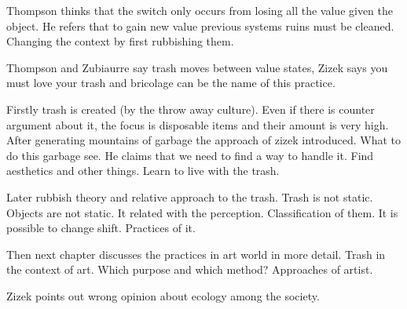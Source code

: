Thompson thinks that the switch only occurs from losing all the value given the object. He refers that to gain new value previous systems ruins must be cleaned. Changing the context by first rubbishing them.

Thompson and Zubiaurre say trash moves between value states, Zizek says you must love your trash and bricolage can be the name of this practice.

Firstly trash is created (by the throw away culture). Even if there is counter argument about it, the focus is disposable items and their amount is very high. After generating mountains of garbage the approach of zizek introduced. What to do this garbage see. He claims that we need to find a way to handle it. Find aesthetics and other things. Learn to live with the trash.


Later rubbish theory and relative approach to the trash. Trash is not static. Objects are not static. It related with the perception. Classification of them. It is possible to change shift. Practices of it.


Then next chapter discusses the practices in art world in more detail. Trash in the context of art. Which purpose and which method? Approaches of artist.






Zizek points out wrong opinion about ecology among the society.
